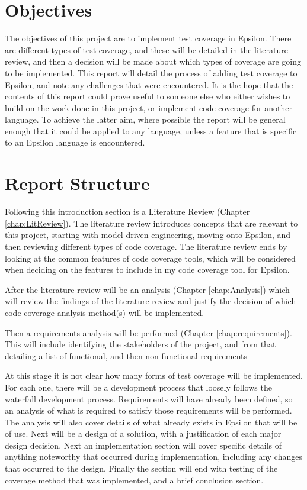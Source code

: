 \section{Objectives}

The objectives of this project are to implement test coverage in Epsilon. There are different types of test coverage, and these will be detailed in the literature review, and then a decision will be made about which types of coverage are going to be implemented. This report will detail the process of adding test coverage to Epsilon, and note any challenges that were encountered. It is the hope that the contents of this report could prove useful to someone else who either wishes to build on the work done in this project, or implement code coverage for another language. To achieve the latter aim, where possible the report will be general enough that it could be applied to any language, unless a feature that is specific to an Epsilon language is encountered.

\section{Report Structure}

Following this introduction section is a Literature Review (Chapter \ref{chap:LitReview}). The literature review introduces concepts that are relevant to this project, starting with model driven engineering, moving onto Epsilon, and then reviewing different types of code coverage. The literature review ends by looking at the common features of code coverage tools, which will be considered when deciding on the features to include in my code coverage tool for Epsilon.

After the literature review will be an analysis (Chapter \ref{chap:Analysis}) which will review the findings of the literature review and justify the decision of which code coverage analysis method(s) will be implemented.

Then a requirements analysis will be performed (Chapter \ref{chap:requirements}). This will include identifying the stakeholders of the project, and from that detailing a list of functional, and then non-functional requirements

At this stage it is not clear how many forms of test coverage will be implemented. For each one, there will be a development process that loosely follows the waterfall development process. Requirements will have already been defined, so an analysis of what is required to satisfy those requirements will be performed. The analysis will also cover details of what already exists in Epsilon that will be of use. Next will be a design of a solution, with a justification of each major design decision. Next an implementation section will cover specific details of anything noteworthy that occurred during implementation, including any changes that occurred to the design. Finally the section will end with testing of the coverage method that was implemented, and a brief conclusion section.

